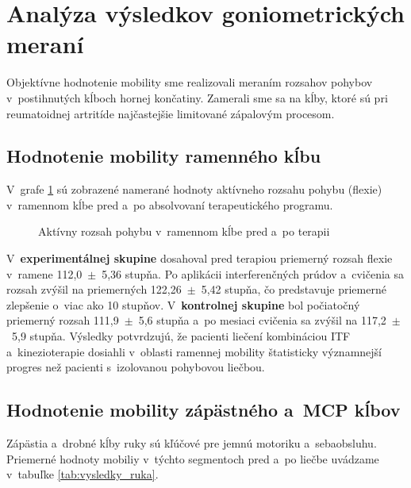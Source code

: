\section{Analýza výsledkov goniometrických meraní}

Objektívne hodnotenie mobility sme realizovali meraním rozsahov pohybov v~postihnutých kĺboch hornej končatiny. Zamerali sme sa na kĺby, ktoré sú pri reumatoidnej artritíde najčastejšie limitované zápalovým procesom.

\subsection{Hodnotenie mobility ramenného kĺbu}

V~grafe \ref{fig:graf_rameno} sú zobrazené namerané hodnoty aktívneho rozsahu pohybu (flexie) v~ramennom kĺbe pred a~po absolvovaní terapeutického programu.

\begin{figure}[H]
    \centering
    \caption{Aktívny rozsah pohybu v~ramennom kĺbe pred a~po terapii}
    \label{fig:graf_rameno}
\end{figure}

V~\textbf{experimentálnej skupine} dosahoval pred terapiou priemerný rozsah flexie v~ramene 112,0~$\pm$~5,36 stupňa. Po aplikácii interferenčných prúdov a~cvičenia sa rozsah zvýšil na priemerných 122,26~$\pm$~5,42 stupňa, čo predstavuje priemerné zlepšenie o~viac ako 10 stupňov. V~\textbf{kontrolnej skupine} bol počiatočný priemerný rozsah 111,9~$\pm$~5,6 stupňa a~po mesiaci cvičenia sa zvýšil na 117,2~$\pm$~5,9 stupňa. Výsledky potvrdzujú, že pacienti liečení kombináciou ITF a~kinezioterapie dosiahli v~oblasti ramennej mobility štatisticky významnejší progres než pacienti s~izolovanou pohybovou liečbou.

\subsection{Hodnotenie mobility zápästného a~MCP kĺbov}

Zápästia a~drobné kĺby ruky sú kľúčové pre jemnú motoriku a~sebaobsluhu. Priemerné hodnoty mobiliy v~týchto segmentoch pred a~po liečbe uvádzame v~tabuľke \ref{tab:vysledky_ruka}.

